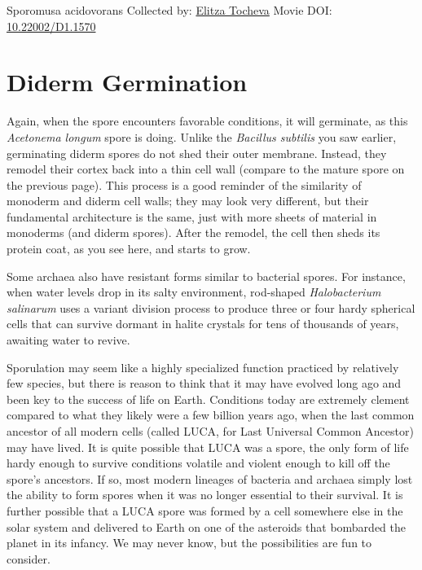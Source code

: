 \documentclass[]{tufte-book}
\begin{document}
\hypertarget{htmlwidget-dae24ad5c6f28092f227}{}

\label{fig:8-10c}Sporomusa acidovorans Collected by: \protect\hyperlink{elitza_tocheva}{Elitza Tocheva} Movie DOI: \href{https://doi.org/10.22002/D1.1570}{10.22002/D1.1570}

\hypertarget{diderm-germination}{%
\section{Diderm Germination}\label{diderm-germination}}

Again, when the spore encounters favorable conditions, it will germinate, as this \emph{Acetonema longum} spore is doing. Unlike the \emph{Bacillus subtilis} you saw earlier, germinating diderm spores do not shed their outer membrane. Instead, they remodel their cortex back into a thin cell wall (compare to the mature spore on the previous page). This process is a good reminder of the similarity of monoderm and diderm cell walls; they may look very different, but their fundamental architecture is the same, just with more sheets of material in monoderms (and diderm spores). After the remodel, the cell then sheds its protein coat, as you see here, and starts to grow.

Some archaea also have resistant forms similar to bacterial spores. For instance, when water levels drop in its salty environment, rod-shaped \emph{Halobacterium salinarum} uses a variant division process to produce three or four hardy spherical cells that can survive dormant in halite crystals for tens of thousands of years, awaiting water to revive.

Sporulation may seem like a highly specialized function practiced by relatively few species, but there is reason to think that it may have evolved long ago and been key to the success of life on Earth. Conditions today are extremely clement compared to what they likely were a few billion years ago, when the last common ancestor of all modern cells (called LUCA, for Last Universal Common Ancestor) may have lived. It is quite possible that LUCA was a spore, the only form of life hardy enough to survive conditions volatile and violent enough to kill off the spore's ancestors. If so, most modern lineages of bacteria and archaea simply lost the ability to form spores when it was no longer essential to their survival. It is further possible that a LUCA spore was formed by a cell somewhere else in the solar system and delivered to Earth on one of the asteroids that bombarded the planet in its infancy. We may never know, but the possibilities are fun to consider.
\end{document}
